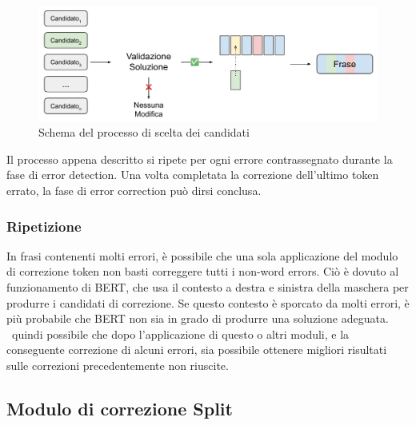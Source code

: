\begin{figure}[H]
\centering
\includegraphics[width=\textwidth]{immagini/metodologia/scelta_candidati}
\caption{Schema del processo di scelta dei candidati}
\label{fig:met_pick}
\end{figure}
Il processo appena descritto si ripete per ogni errore contrassegnato durante la fase di error detection. Una volta completata la correzione dell'ultimo token errato, la fase di error correction può dirsi conclusa.

\subsubsection{Ripetizione}
In frasi contenenti molti errori, è possibile che una sola applicazione del modulo di correzione token non basti correggere tutti i non-word errors. Ciò è dovuto al funzionamento di BERT, che usa il contesto a destra e sinistra della maschera per produrre i candidati di correzione. Se questo contesto è sporcato da molti errori, è più probabile che BERT non sia in grado di produrre una soluzione adeguata. \E\ quindi possibile che dopo l'applicazione di questo o altri moduli, e la conseguente correzione di alcuni errori, sia possibile ottenere migliori risultati sulle correzioni precedentemente non riuscite.

\subsection{Modulo di correzione Split}
\label{sec:met_mod_split}

